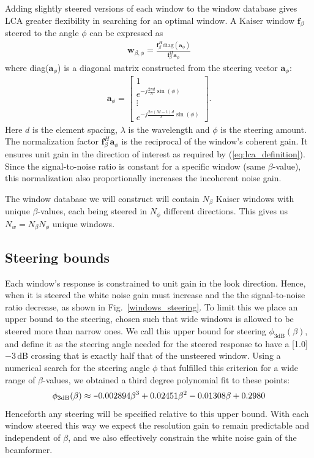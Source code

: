 \documentclass[10pt,journal,draftclsnofoot,onecolumn]{IEEEtran}
\newcommand\Fig[1]{Fig.~\ref{#1}}
\newcommand\bmat[1]{\begin{bmatrix}#1\end{bmatrix}}
\newcommand\diag{\text{diag}}
\renewcommand\H{^{\scriptscriptstyle H}}
\renewcommand\vec[1]{\boldsymbol{#1}}
\newcommand\1{\vec 1}
\renewcommand*\a{\vec a}
\newcommand*\f{\vec f}
\newcommand*\w{\vec w}
\newcommand\minus{\scalebox{0.75}[1.0]{$-$}}
\begin{document}
Adding slightly steered versions of each window to the window database gives LCA greater flexibility in searching for an optimal window. A Kaiser window $\f_\beta$ steered to the angle $\phi$ can be expressed as 
%
\begin{align}
\w_{\beta,\phi} = \frac{\f_\beta\H\diag{(\a_\phi)}}{\f_\beta\H\a_\phi}\label{eq:steered_window}
\end{align}
%
where diag($\a_\phi$) is a diagonal matrix constructed from the steering vector $\a_\phi$:
%
\begin{align}
\a_\phi = \bmat{
1 \\
e^{-j\frac{2\pi d}{\lambda}\sin(\phi)} \\
\vdots\\
e^{-j\frac{2\pi (M-1)d}{\lambda}\sin(\phi)}
}.\label{eq:steering_vector}
\end{align}
%
Here $d$ is the element spacing, $\lambda$ is the wavelength and $\phi$ is the steering amount. The normalization factor $\f_\beta\H\a_\phi$ is the reciprocal of the window's coherent gain. It ensures unit gain in the direction of interest as required by (\ref{eq:lca_definition}). Since the signal-to-noise ratio is constant for a specific window (same $\beta$-value), this normalization also proportionally increases the incoherent noise gain.

The window database we will construct will contain $N_\beta$ Kaiser windows with unique $\beta$-values, each being steered in $N_\phi$ different directions. This gives us $N_w = N_\beta N_\phi$ unique windows.


\subsection{Steering bounds}\label{sec:lca_steering_bounds}

Each window's response is constrained to unit gain in the look direction. Hence, when it is steered the white noise gain must increase and the the signal-to-noise ratio decrease, as shown in \Fig{windows_steering}. To limit this we place an upper bound to the steering, chosen such that wide windows is allowed to be steered more than narrow ones. We call this upper bound for steering $\phi_{\text{3dB}}(\beta)$, and define it as the steering angle needed for the steered response to have a \minus{}3\,dB crossing that is exactly half that of the unsteered window. Using a numerical search for the steering angle $\phi$ that fulfilled this criterion for a wide range of $\beta$-values, we obtained a third degree polynomial fit to these points:
%
\begin{align}
\phi_\text{3dB}(\beta) \approx \minus{}0.002894\beta^3 + 0.02451\beta^2 - 0.01308\beta + 0.2980\label{eq:steering_kaiser_3dB}
\end{align}
%
Henceforth any steering will be specified relative to this upper bound. With each window steered this way we expect the resolution gain to remain predictable and independent of $\beta$, and we also effectively constrain the white noise gain of the beamformer.
\end{document}
